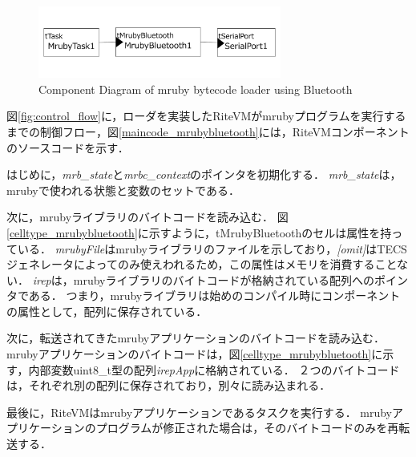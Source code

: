 \documentclass[submit]{ipsj_v2/UTF8/ipsj}
\begin{document}
\begin{figure}[t]
    \centering
    \includegraphics[width=8cm,clip]{../EMSOFT2016/figure/component_bluetooth.pdf}
    \caption{Component Diagram of mruby bytecode loader using Bluetooth}
    \label{fig:component_bluetooth}
\end{figure}

図\ref{fig:control_flow}に，ローダを実装したRiteVMがmrubyプログラムを実行するまでの制御フロー，図\ref{maincode_mrubybluetooth}には，RiteVMコンポーネントのソースコードを示す．

はじめに，{\it mrb\_state}と{\it mrbc\_context}のポインタを初期化する．
{\it mrb\_state}は，mrubyで使われる状態と変数のセットである．

次に，mrubyライブラリのバイトコードを読み込む．
図\ref{celltype_mrubybluetooth}に示すように，tMrubyBluetoothのセルは属性を持っている．
{\it mrubyFile}はmrubyライブラリのファイルを示しており，{\it [omit]}はTECSジェネレータによってのみ使えわれるため，この属性はメモリを消費することない．
{\it irep}は，mrubyライブラリのバイトコードが格納されている配列へのポインタである．
つまり，mrubyライブラリは始めのコンパイル時にコンポーネントの属性として，配列に保存されている．

次に，転送されてきたmrubyアプリケーションのバイトコードを読み込む．
mrubyアプリケーションのバイトコードは，図\ref{celltype_mrubybluetooth}に示す，内部変数uint8\_t型の配列{\it irepApp}に格納されている．
２つのバイトコードは，それぞれ別の配列に保存されており，別々に読み込まれる．

最後に，RiteVMはmrubyアプリケーションであるタスクを実行する．
mrubyアプリケーションのプログラムが修正された場合は，そのバイトコードのみを再転送する．
\end{document}
